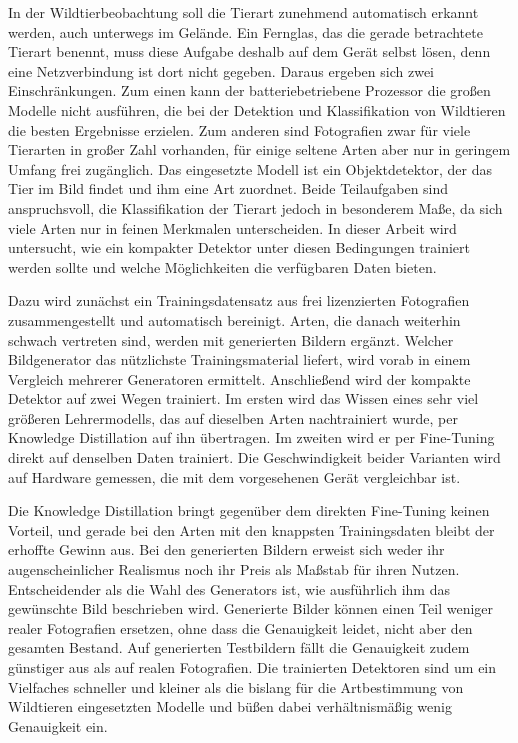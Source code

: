 In der Wildtierbeobachtung soll die Tierart zunehmend automatisch erkannt werden, auch unterwegs im Gelände. Ein Fernglas, das die gerade betrachtete Tierart benennt, muss diese Aufgabe deshalb auf dem Gerät selbst lösen, denn eine Netzverbindung ist dort nicht gegeben. Daraus ergeben sich zwei Einschränkungen. Zum einen kann der batteriebetriebene Prozessor die großen Modelle nicht ausführen, die bei der Detektion und Klassifikation von Wildtieren die besten Ergebnisse erzielen. Zum anderen sind Fotografien zwar für viele Tierarten in großer Zahl vorhanden, für einige seltene Arten aber nur in geringem Umfang frei zugänglich. Das eingesetzte Modell ist ein Objektdetektor, der das Tier im Bild findet und ihm eine Art zuordnet. Beide Teilaufgaben sind anspruchsvoll, die Klassifikation der Tierart jedoch in besonderem Maße, da sich viele Arten nur in feinen Merkmalen unterscheiden. In dieser Arbeit wird untersucht, wie ein kompakter Detektor unter diesen Bedingungen trainiert werden sollte und welche Möglichkeiten die verfügbaren Daten bieten.

Dazu wird zunächst ein Trainingsdatensatz aus frei lizenzierten Fotografien zusammengestellt und automatisch bereinigt. Arten, die danach weiterhin schwach vertreten sind, werden mit generierten Bildern ergänzt. Welcher Bildgenerator das nützlichste Trainingsmaterial liefert, wird vorab in einem Vergleich mehrerer Generatoren ermittelt. Anschließend wird der kompakte Detektor auf zwei Wegen trainiert. Im ersten wird das Wissen eines sehr viel größeren Lehrermodells, das auf dieselben Arten nachtrainiert wurde, per Knowledge Distillation auf ihn übertragen. Im zweiten wird er per Fine-Tuning direkt auf denselben Daten trainiert. Die Geschwindigkeit beider Varianten wird auf Hardware gemessen, die mit dem vorgesehenen Gerät vergleichbar ist.

Die Knowledge Distillation bringt gegenüber dem direkten Fine-Tuning keinen Vorteil, und gerade bei den Arten mit den knappsten Trainingsdaten bleibt der erhoffte Gewinn aus. Bei den generierten Bildern erweist sich weder ihr augenscheinlicher Realismus noch ihr Preis als Maßstab für ihren Nutzen. Entscheidender als die Wahl des Generators ist, wie ausführlich ihm das gewünschte Bild beschrieben wird. Generierte Bilder können einen Teil weniger realer Fotografien ersetzen, ohne dass die Genauigkeit leidet, nicht aber den gesamten Bestand. Auf generierten Testbildern fällt die Genauigkeit zudem günstiger aus als auf realen Fotografien. Die trainierten Detektoren sind um ein Vielfaches schneller und kleiner als die bislang für die Artbestimmung von Wildtieren eingesetzten Modelle und büßen dabei verhältnismäßig wenig Genauigkeit ein.
